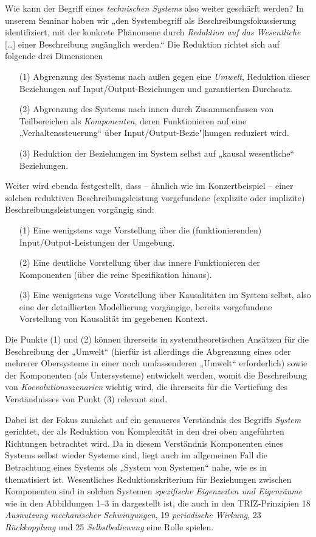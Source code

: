 \documentclass[11pt,a4paper]{article}
\begin{document}
Wie kann der Begriff eines \emph{technischen Systems} also weiter geschärft
werden?  In unserem Seminar \cite{Graebe2020} haben wir „den Systembegriff als
Beschreibungsfokussierung identifiziert, mit der konkrete Phänomene durch
\emph{Reduktion auf das Wesentliche} [\ldots] einer Beschreibung zugänglich
werden.“  Die Reduktion richtet sich auf folgende drei Dimensionen
\cite[S. 18]{Graebe2020} 
\begin{itemize}
\item [(1)] Abgrenzung des Systems nach außen gegen eine \emph{Umwelt},
  Reduktion dieser Beziehungen auf Input/Output-Beziehungen und garantierten
  Durchsatz.
\item [(2)] Abgrenzung des Systems nach innen durch Zusammenfassen von
  Teilbereichen als \emph{Komponenten}, deren Funktionieren auf eine
  „Verhaltenssteuerung“ über Input/Output-Bezie"|hungen reduziert wird.
\item [(3)] Reduktion der Beziehungen im System selbst auf „kausal
  wesentliche“ Beziehungen.
\end{itemize}
Weiter wird ebenda festgestellt, dass -- ähnlich wie im Konzertbeispiel --
einer solchen reduktiven Beschreibungsleistung vorgefundene (explizite oder
implizite) Beschreibungsleistungen vorgängig sind:
\begin{enumerate}
\item[(1)] Eine wenigstens vage Vorstellung über die (funktionierenden)
  Input/Output-Leistungen der Umgebung.
\item[(2)] Eine deutliche Vorstellung über das innere Funktionieren der
  Komponenten (über die reine Spezifikation hinaus).
\item[(3)] Eine wenigstens vage Vorstellung über Kausalitäten im System
  selbst, also eine der detaillierten Modellierung vorgängige, bereits
  vorgefundene Vorstellung von Kausalität im gegebenen Kontext.
\end{enumerate}
Die Punkte (1) und (2) können ihrerseits in systemtheoretischen Ansätzen für
die Beschreibung der „Umwelt“ (hierfür ist allerdings die Abgrenzung eines
oder mehrerer Obersysteme in einer noch umfassenderen „Umwelt“ erforderlich)
sowie der Komponenten (als Untersysteme) entwickelt werden, womit die
Beschreibung von \emph{Koevolutionsszenarien} wichtig wird, die ihrerseits für
die Vertiefung des Verständnisses von Punkt (3) relevant sind.

Dabei ist der Fokus zunächst auf ein genaueres Verständnis des Begriffs
\emph{System} gerichtet, der als Reduktion von Komplexität in den drei oben
angeführten Richtungen betrachtet wird. Da in diesem Verständnis Komponenten
eines Systems selbst wieder Systeme sind, liegt auch im allgemeinen Fall die
Betrachtung eines Systems als „System von Systemen“ nahe, wie es in
\cite{Holling2000} thematisiert ist.  Wesentliches Reduktionskriterium für
Beziehungen zwischen Komponenten sind in solchen Systemen \emph{spezifische
  Eigenzeiten und Eigenräume} wie in den Abbildungen 1--3 in
\cite{Holling2000} dargestellt ist, die auch in den TRIZ-Prinzipien 18
\emph{Ausnutzung mechanischer Schwingungen}, 19 \emph{periodische Wirkung}, 23
\emph{Rückkopplung} und 25 \emph{Selbstbedienung} eine Rolle spielen.
\end{document}
